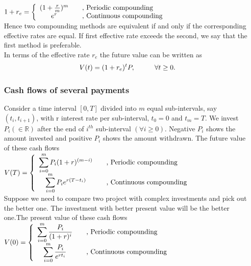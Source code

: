 $1+r_{e}= \left\{ 
  \begin{array}{ c l }
    (1+\frac{r}{m})^{m} & \quad \textrm{, Periodic compounding}\\
    e^{r}                 & \quad \textrm{, Continuous compounding}
  \end{array}
\right.$
\\Hence two compounding methods are equivalent if and only if the corresponding effective rates are equal. If first effective rate exceeds the second, we say that the first method is preferable.
\\In terms of the effective rate $r_{e}$ the future value can be written as \begin{equation}
    V(t)=(1+r_{e})^{t}P, \hspace{10mm} \forall t \geq 0.
\end{equation}
\subsubsection{Cash flows of several payments}
Consider a time interval $[0,T]$ divided into $m$ equal sub-intervals, say $(t_{i},t_{i+1})$, with r interest rate per sub-interval, $t_{0}=0$ and $t_{m}=T$. We invest $P_{i} (\in \mathbb{R})$ after the end of $i^{th}$ sub-interval $(\forall i \geq 0)$. Negative $P_{i}$ shows the amount invested and positive $P_{i}$ shows the amount withdrawn. The future value of these cash flows\\
$V(T)= \left\{ 
  \begin{array}{ c l }
    \displaystyle \sum_{i=0}^{m} P_{i}(1+r)^{(m-i)} & \quad \textrm{, Periodic compounding}\\
    \displaystyle \sum_{i=0}^{m} P_{i}e^{r(T-t_{i})}                 & \quad \textrm{, Continuous compounding}
  \end{array}
\right.$
\\Suppose we need to compare two project with complex investments and pick out the better one.  The investment with better present value will be the better one.The present value of these cash flows\\
$V(0)= \left\{ 
  \begin{array}{ c l }
    \displaystyle \sum_{i=0}^{m} \frac{P_{i}}{(1+r)^{i}} & \quad \textrm{, Periodic compounding}\\
    \displaystyle \sum_{i=0}^{m} \frac{P_{i}}{e^{rt_{i}}}                 & \quad \textrm{, Continuous compounding}
  \end{array}
\right.$